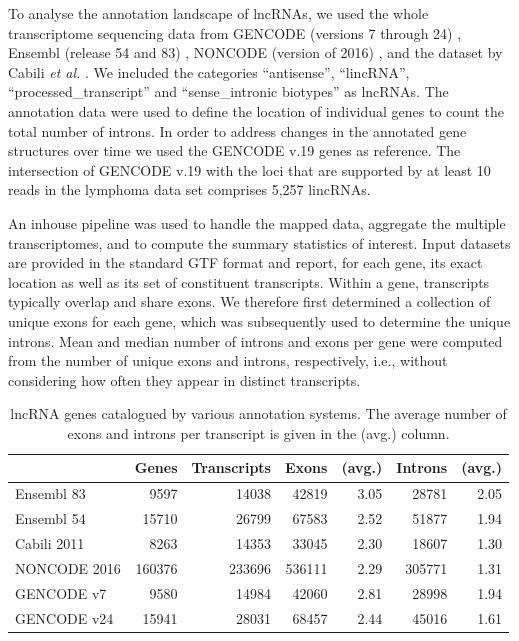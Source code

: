 \documentclass[ncrna,article,submit,moreauthors,pdftex,10pt,a4paper]{mdpi}
\begin{document}
To analyse the annotation landscape of lncRNAs, we used the whole
transcriptome sequencing data from GENCODE (versions 7 through 24)
\cite{harrow2012}, Ensembl (release 54 and 83) \cite{flicek2014}, NONCODE
(version of 2016) \cite{zhao2016}, and the dataset by Cabili \textit{et
  al.}  \cite{cabili2011}. We included the categories ``antisense'',
``lincRNA'', ``processed\_transcript'' and ``sense\_intronic biotypes'' as
lncRNAs.  The annotation data were used to define the location of
individual genes to count the total number of introns. In order to address
changes in the annotated gene structures over time we used the GENCODE v.19
genes as reference. The intersection of GENCODE v.19 with the loci that are
supported by at least 10 reads in the lymphoma data set comprises 5,257
lincRNAs.

An inhouse pipeline was used to handle the mapped data, aggregate the
multiple transcriptomes, and to compute the summary statistics of
interest. Input datasets are provided in the standard GTF format and
report, for each gene, its exact location as well as its set of constituent
transcripts. Within a gene, transcripts typically overlap and share exons.
We therefore first determined a collection of unique exons for each gene,
which was subsequently used to determine the unique introns. Mean and
median number of introns and exons per gene were computed from the number
of unique exons and introns, respectively, i.e., without considering how often
they appear in distinct transcripts.

\begin{table}[ht]
  \caption{lncRNA genes catalogued by various annotation systems. The
    average number of exons and introns per transcript is given in the
    (avg.) column.} 
\label{tab:consortia}
\begin{center}\small
\begin{tabular}{|l|rr|rr|rr|}
  \hline
  & Genes & Transcripts & Exons & (avg.) & 
                        Introns & (avg.) \\ 
   \hline
  Ensembl 83   &   9597 &  14038 &  42819 & 3.05 &  28781 & 2.05 \\ 
  Ensembl 54   &  15710 &  26799 &  67583 & 2.52 &  51877 & 1.94 \\ 
  Cabili 2011  &   8263 &  14353 &  33045 & 2.30 &  18607 & 1.30 \\ 
  NONCODE 2016 & 160376 & 233696 & 536111 & 2.29 & 305771 & 1.31 \\ 
  GENCODE v7   &   9580 &  14984 &  42060 & 2.81 &  28998 & 1.94 \\ 
  GENCODE v24  &  15941 &  28031 &  68457 & 2.44 &  45016 & 1.61 \\ 
   \hline
\end{tabular}
\end{center}
\end{table}
\end{document}
